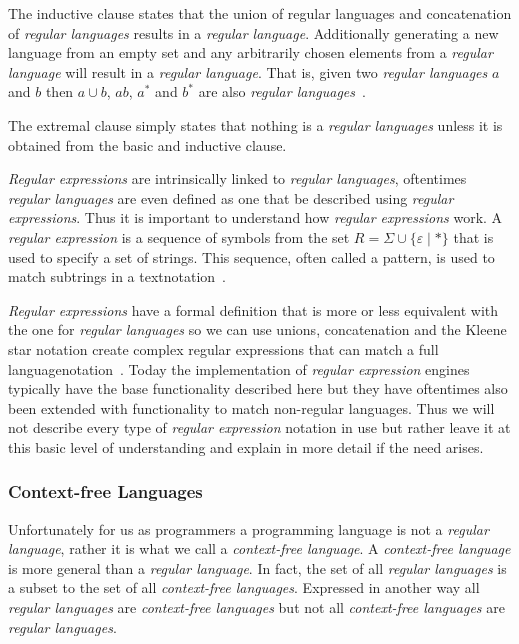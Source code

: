 \documentclass{sigchi}
\begin{document}
The inductive clause states that the union of regular languages and concatenation of \emph{regular languages} results in a \emph{regular language}. Additionally generating a new language from an empty set and any arbitrarily chosen elements from a \emph{regular language} will result in a \emph{regular language}. That is, given two \emph{regular languages} $a$ and $b$ then $a \cup b$, $ab$, $a^*$ and $b^*$ are also \emph{regular languages}~\cite{Kozen:1997}.

The extremal clause simply states that nothing is a \emph{regular languages} unless it is obtained from the basic and inductive clause.

\emph{Regular expressions} are intrinsically linked to \emph{regular languages}, oftentimes \emph{regular languages} are even defined as one that be described using \emph{regular expressions}. Thus it is important to understand how \emph{regular expressions} work. A \emph{regular expression} is a sequence of symbols from the set $R = \Sigma \cup \{\varepsilon \mid*\}$ that is used to specify a set of strings. This sequence, often called a pattern, is used to match subtrings in a textnotation~\cite{Kozen:1997}. 

\emph{Regular expressions} have a formal definition that is more or less equivalent with the one for \emph{regular languages} so we can use unions, concatenation and the Kleene star notation create complex regular expressions that can match a full languagenotation~\cite{Kozen:1997}. Today the implementation of \emph{regular expression} engines typically have the base functionality described here but they have oftentimes also been extended with functionality to match non-regular languages. Thus we will not describe every type of \emph{regular expression} notation in use but rather leave it at this basic level of understanding and explain in more detail if the need arises.


\subsubsection{Context-free Languages}
Unfortunately for us as programmers a programming language is not a \emph{regular language}, rather it is what we call a \emph{context-free language}. A \emph{context-free language} is more general than a \emph{regular language}. In fact, the set of all \emph{regular languages} is a subset to the set of all \emph{context-free languages}. Expressed in another way all \emph{regular languages} are \emph{context-free languages} but not all \emph{context-free languages} are \emph{regular languages}.
\end{document}
